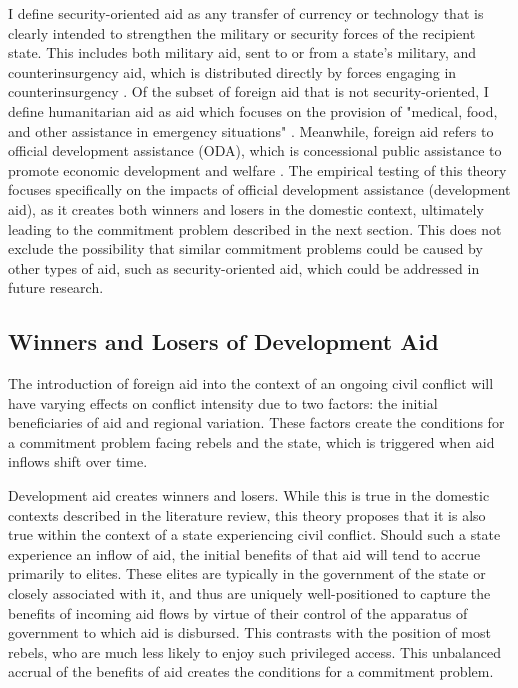 \documentclass[12pt, letterpaper]{article}
\renewcommand{\cite}{\citep}
\begin{document}
I define security-oriented aid as any transfer of currency or technology that is clearly intended to strengthen the military or security forces of the recipient state. This includes both military aid, sent to or from a state’s military, and counterinsurgency aid, which is distributed directly by forces engaging in counterinsurgency \cite[p.~363]{findley2018}. Of the subset of foreign aid that is not security-oriented, I define humanitarian aid as aid which focuses on the provision of "medical, food, and other assistance in emergency situations" \cite[p.~363]{findley2018}. Meanwhile, foreign aid refers to official development assistance (ODA), which is concessional public assistance to promote economic development and welfare \cite[p.~362]{findley2018}. The empirical testing of this theory focuses specifically on the impacts of official development assistance (development aid), as it creates both winners and losers in the domestic context, ultimately leading to the commitment problem described in the next section. This does not exclude the possibility that similar commitment problems could be caused by other types of aid, such as security-oriented aid, which could be addressed in future research.

\subsection{Winners and Losers of Development Aid}

The introduction of foreign aid into the context of an ongoing civil conflict will have varying effects on conflict intensity due to two factors: the initial beneficiaries of aid and regional variation. These factors create the conditions for a commitment problem facing rebels and the state, which is triggered when aid inflows shift over time.

Development aid creates winners and losers. While this is true in the domestic contexts described in the literature review, this theory proposes that it is also true within the context of a state experiencing civil conflict. Should such a state experience an inflow of aid, the initial benefits of that aid will tend to accrue primarily to elites. These elites are typically in the government of the state or closely associated with it, and thus are uniquely well-positioned to capture the benefits of incoming aid flows by virtue of their control of the apparatus of government to which aid is disbursed. This contrasts with the position of most rebels, who are much less likely to enjoy such privileged access. This unbalanced accrual of the benefits of aid creates the conditions for a commitment problem.
\end{document}
